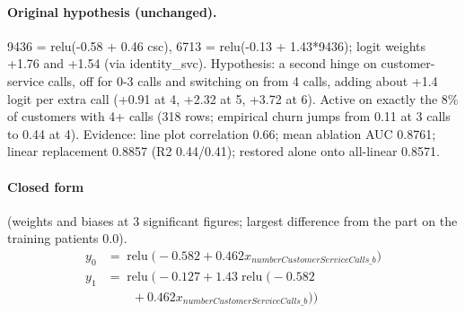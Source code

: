 \documentclass[a4paper,10pt]{article}
\newif\ifreviewmarks
\newcommand{\reviewrule}{\noindent{\color{BrickRed}\rule{\linewidth}{0.8pt}}}
\newenvironment{drafted}[1][]{%
  \ifreviewmarks\par\addvspace{\medskipamount}\reviewrule\par\nopagebreak
  \noindent{\color{BrickRed}\sffamily\footnotesize\textbf{Thesis Draft}\quad #1\hfill review}\par\nopagebreak\smallskip\fi}{%
  \ifreviewmarks\par\smallskip\noindent{\color{BrickRed}\sffamily\footnotesize end of thesis draft}\par\nopagebreak\reviewrule\par\medskip\fi}
\begin{document}
\begin{drafted}[plain-language layer: churn100-s4-c2]
\paragraph{Original hypothesis (unchanged).} 9436 = relu(-0.58 + 0.46 csc), 6713 = relu(-0.13 + 1.43*9436); logit weights +1.76 and +1.54 (via identity\_\allowbreak{}svc). Hypothesis: a second hinge on customer-service calls, off for 0-3 calls and switching on from 4 calls, adding about +1.4 logit per extra call (+0.91 at 4, +2.32 at 5, +3.72 at 6). Active on exactly the 8\% of customers with 4+ calls (318 rows; empirical churn jumps from 0.11 at 3 calls to 0.44 at 4). Evidence: line plot correlation 0.66; mean ablation AUC 0.8761; linear replacement 0.8857 (R2 0.44/0.41); restored alone onto all-linear 0.8571.
\paragraph{Closed form} {\footnotesize(weights and biases at 3 significant figures; largest difference from the part on the training patients 0.0).}
{\small\begingroup\allowdisplaybreaks
\begin{align*}
y_{0} &= \operatorname{relu}\bigl(-0.582 + 0.462 x_{numberCustomerServiceCalls\_b}\bigr) \\
y_{1} &= \operatorname{relu}\bigl(-0.127 + 1.43 \operatorname{relu}\bigl(-0.582 \\
&\qquad + 0.462 x_{numberCustomerServiceCalls\_b}\bigr)\bigr)
\end{align*}\endgroup}


\end{drafted}
\end{document}
